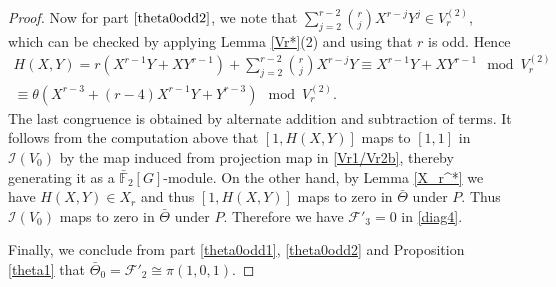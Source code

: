\documentclass[11pt, reqno]{amsart}
\numberwithin{equation}{section}
\newcommand{\F}{\mathbb{F}}
\theoremstyle{definition}
\theoremstyle{remark}
\theoremstyle{definition}
\theoremstyle{remark}
\theoremstyle{remark}
\begin{document}
\begin{proof}
    Now for part $\eqref{theta0odd2}$, %
      we note that $\displaystyle \sum_{j=2}^{r-2}{r \choose j}X^{r-j}Y^j \in V_{r}^{(2)}$, which can be checked by applying Lemma \ref{Vr*}(2) and using that $r$ is odd. Hence \begin{eqnarray*}
          H(X,Y)= r(X^{r-1}Y+XY^{r-1})+ \sum_{j=2}^{r-2}{r \choose j}X^{r-j}Y \equiv X^{r-1}Y+XY^{r-1} \mod V_{r}^{(2)}\\
           \equiv \theta\left(X^{r-3} + (r-4)X^{r-1}Y + Y^{r-3}\right)  \mod V_{r}^{(2)}.
           \end{eqnarray*}%
      The last congruence is obtained by alternate addition and subtraction of terms. %
      It follows from the computation above that $[1,H(X,Y)]$ maps to $[1,1]$ in $\mathcal{I}(V_{0})$ by the map induced from projection map in \eqref{Vr1/Vr2b}, %
      thereby generating it as a $\bar{\F}_{2}[G]$-module.   On the other hand, by Lemma \ref{X_r^*} we have  $H(X,Y)\in X_{r}$ and thus $[1,H(X,Y)]$ maps to zero in $\bar{\Theta}$ under $P$. Thus $\mathcal{I}(V_{0})$ maps to zero in $\bar{\Theta}$ under $P$.  Therefore we have $\mathcal{F}'_{3}=0$ in \eqref{diag4}.
   
    Finally, we conclude from part \eqref{theta0odd1}, \eqref{theta0odd2} and Proposition \ref{theta1} that $\bar{\Theta}_{0}=\mathcal{F}'_{2} \cong \pi(1,0,1).$
    \end{proof}
\end{document}
